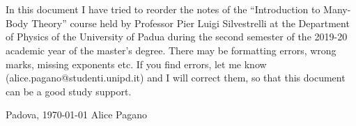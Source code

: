 \documentclass[11pt, a4paper, twoside, openright]{book}
\begin{document}
\makeatletter
\renewcommand{\@marginparreset}{%
  \reset@font\small
  \raggedright
  \slshape
  \@setminipage
}
\makeatother


\frontmatter

\pagecolor{blue} %


\pagecolor{white}


\chapter*{}
\noindent In this document I have tried to reorder the notes of the “Introduction to Many-Body Theory” course held by Professor Pier Luigi Silvestrelli at the Department
of Physics of the University of Padua during the second semester of the 2019-20 academic year of the master's degree.
There may be formatting errors, wrong marks, missing exponents etc. If you find errors, let me know (alice.pagano@studenti.unipd.it) and I will correct them, so that this document can be a good study support.

\vspace{1cm}
\noindent Padova, \today  \hspace{6cm} Alice Pagano

\tableofcontents


\pagestyle{plain}



\makeatletter
\renewcommand{\@marginparreset}{%
  \reset@font\small
  \raggedright
  \slshape
  \@setminipage
}
\makeatother
\end{document}
